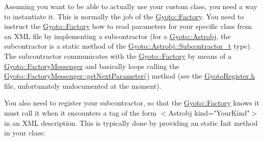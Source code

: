 Assuming you want to be able to actually use your custom class, you need a way to instantiate it. This is normally the job of the \mbox{\hyperlink{class_gyoto_1_1_factory}{Gyoto\+::\+Factory}}. You need to instruct the \mbox{\hyperlink{class_gyoto_1_1_factory}{Gyoto\+::\+Factory}} how to read parameters for your specific class from an XML file by implementing a subcontractor (for a \mbox{\hyperlink{namespace_gyoto_1_1_astrobj}{Gyoto\+::\+Astrobj}}, the subcontractor is a static method of the \mbox{\hyperlink{namespace_gyoto_1_1_astrobj_aa53c7ada58c8c8f3799c3485b7d8f3bb}{Gyoto\+::\+Astrobj\+::\+Subcontractor\+\_\+t}} type). The subcontractor communicates with the \mbox{\hyperlink{class_gyoto_1_1_factory}{Gyoto\+::\+Factory}} by means of a \mbox{\hyperlink{class_gyoto_1_1_factory_messenger}{Gyoto\+::\+Factory\+Messenger}} and basically loops calling the \mbox{\hyperlink{class_gyoto_1_1_factory_messenger_a716340221e527c61a05af389590b53f4}{Gyoto\+::\+Factory\+Messenger\+::get\+Next\+Parameter()}} method (see the \mbox{\hyperlink{_gyoto_register_8h}{Gyoto\+Register.\+h}} file, unfortunately undocumented at the moment).

You also need to register your subcontractor, so that the \mbox{\hyperlink{class_gyoto_1_1_factory}{Gyoto\+::\+Factory}} knows it must call it when it encounters a tag of the form $<$Astrobj kind="{}Your\+Kind"{}$>$ in an XML description. This is typically done by providing an static Init method in your class\+: 
\begin{DoxyCode}{0}
\DoxyCodeLine{\}}

\end{DoxyCode}


